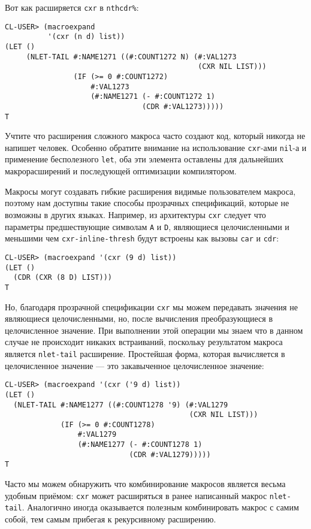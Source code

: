 Вот как расширяется \verb"cxr" в \verb"nthcdr%":

\begin{verbatim}
CL-USER> (macroexpand
          '(cxr (n d) list))
(LET ()
     (NLET-TAIL #:NAME1271 ((#:COUNT1272 N) (#:VAL1273 
                                             (CXR NIL LIST)))
                (IF (>= 0 #:COUNT1272)
                    #:VAL1273
                    (#:NAME1271 (- #:COUNT1272 1) 
                                (CDR #:VAL1273)))))
T
\end{verbatim}

Учтите что расширения сложного макроса часто создают код, который никогда не напишет человек. Особенно обратите внимание на использование \verb"cxr"-ами \verb"nil"-а и применение бесполезного \verb"let", оба эти элемента оставлены для дальнейших макрорасширений и последующей оптимизации компилятором.

Макросы могут создавать гибкие расширения видимые пользователем макроса, поэтому нам доступны такие способы прозрачных спецификаций, которые не возможны в других языках. Например, из архитектуры \verb"cxr" следует что параметры предшествующие символам \verb"A" и \verb"D", являющиеся целочисленными и меньшими чем \verb"cxr-inline-thresh" будут встроены как вызовы \verb"car" и \verb"cdr":

\begin{verbatim}
CL-USER> (macroexpand '(cxr (9 d) list))
(LET ()
  (CDR (CXR (8 D) LIST)))
T
\end{verbatim}

Но, благодаря прозрачной спецификации \verb"cxr" мы можем передавать значения не являющиеся целочисленными, но, после вычисления преобразующиеся в целочисленное значение. При выполнении этой операции мы знаем что в данном случае не происходит никаких встраиваний, поскольку результатом макроса является \verb"nlet-tail" расширение. Простейшая форма, которая вычисляется в целочисленное значение --- это закавыченное целочисленное значение:

\begin{verbatim}
CL-USER> (macroexpand '(cxr ('9 d) list))
(LET ()
  (NLET-TAIL #:NAME1277 ((#:COUNT1278 '9) (#:VAL1279 
                                           (CXR NIL LIST)))
             (IF (>= 0 #:COUNT1278)
                 #:VAL1279
                 (#:NAME1277 (- #:COUNT1278 1) 
                             (CDR #:VAL1279)))))
T
\end{verbatim}

Часто мы можем обнаружить что комбинирование макросов является весьма удобным приёмом: \verb"cxr" может расширяться в ранее написанный макрос \verb"nlet-tail". Аналогично иногда оказывается полезным комбинировать макрос с самим собой, тем самым прибегая к рекурсивному расширению.

